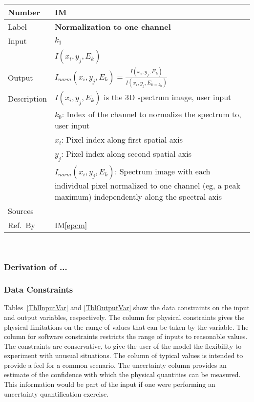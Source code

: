 \documentclass[12pt]{article}
\newcommand{\colAwidth}{0.13\textwidth}
\newcommand{\colBwidth}{0.82\textwidth}
\newcounter{instnum} %
\newcommand{\iref}[1]{IM\ref{#1}}
\begin{document}
~\newline


\noindent
\begin{minipage}{\textwidth}
	\renewcommand*{\arraystretch}{1.5}
	\begin{tabular}{| p{\colAwidth} | p{\colBwidth}|}
		\hline
		\rowcolor[gray]{0.9}
		Number& IM{instnum}\theinstnum \label{ewat}\\
		\hline
		Label& \bf Normalization to one channel\\
		\hline
		Input& $k_1$\\
		& $I(x_i,y_j,E_k)$\\
		\hline
		Output& $I_{norm}(x_i,y_j,E_k)=\frac{I(x_i,y_j,E_k)}{I(x_i,y_j,E_{k=k_0})}$\\
		\hline
		Description&$I(x_i,y_j,E_k)$ is the 3D spectrum image, user input\\
		&$k_0$: Index of the channel to normalize the spectrum to, user input\\
		&$x_i$: Pixel index along first spatial axis\\
		&$y_j$: Pixel index along second spatial axis\\
		&$I_{norm}(x_i,y_j,E_k)$: Spectrum image with each individual pixel normalized to one channel (eg, a peak maximum) independently along the spectral axis\\
		\hline
		Sources&~\cite{Lightstone2012} \ \\
		\hline
		Ref.\ By & \iref{epcm}\\
		\hline
	\end{tabular}
\end{minipage}\\


\subsubsection*{Derivation of ...}


\subsubsection{Data Constraints} \label{sec_DataConstraints}    

Tables~\ref{TblInputVar} and \ref{TblOutputVar} show the data constraints on the
input and output variables, respectively.  The column for physical constraints gives
the physical limitations on the range of values that can be taken by the
variable.  The column for software constraints restricts the range of inputs to
reasonable values.  The constraints are conservative, to give the user of the
model the flexibility to experiment with unusual situations.  The column of
typical values is intended to provide a feel for a common scenario.  The
uncertainty column provides an estimate of the confidence with which the
physical quantities can be measured.  This information would be part of the
input if one were performing an uncertainty quantification exercise.
\end{document}
